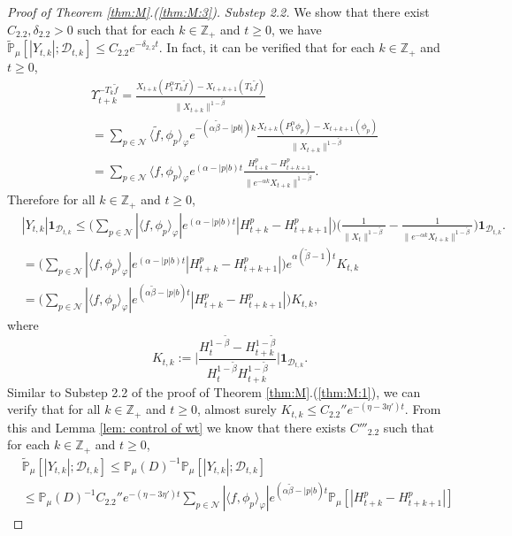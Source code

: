 \documentclass[12pt,a4paper]{amsart}
\theoremstyle{plain}
\theoremstyle{definition}
\numberwithin{equation}{section}
\begin{document}
\begin{proof}[Proof of Theorem \ref{thm:M}.(\ref{thm:M:3})]
  \emph{Substep 2.2.} We show that there exist $C_{2.2}, \delta_{2.2}>0$ such that for each $k \in \mathbb Z_+$ and $t\geq 0$, we have $\widetilde {\mathbb {P}}_\mu[|Y_{t,k}|; \mathcal D_{t,k}]\leq C_{2.2}e^{- \delta_{2,2} t}$.
  In fact, it can be verified that for each $k \in \mathbb Z_+$ and $t\geq 0$,
  \begin{align}
    & \Upsilon_{t+k}^{-T_k\tilde f}
      = \frac{X_{t+k}(P^\alpha_1T_k\tilde f) - X_{t+k+1}(T_k \tilde f)}{\|X_{t+k}\|^{1 - \tilde \beta}}
    \\& = \sum_{p\in \mathcal N}
    \langle\tilde f,\phi_p\rangle_\varphi e^{-(\alpha \tilde \beta - |pb|)k}\frac{ X_{t+k}(P_1^\alpha \phi_p) - X_{t+k+1}(\phi_p)}{\|X_{t+k}\|^{1 - \tilde \beta}}
    \\& = \sum_{p\in \mathcal N}
    \langle f,\phi_p\rangle_\varphi  e^{(\alpha  -|p|b)t}\frac{H_{t+k}^p-H_{t+k+1}^p }{\|e^{-\alpha k}X_{t+k}\|^{1 - \tilde \beta}}.
  \end{align}
  Therefore for all $k\in \mathbb Z_+$ and $t\geq 0$,
  \begin{align}
    &|Y_{t,k}| \mathbf 1_{\mathcal D_{t,k}}
      \leq \Big( \sum_{p\in \mathcal N}|\langle f,\phi_p\rangle_\varphi|  e^{(\alpha  -|p|b)t} | H_{t+k}^p-H_{t+k+1}^p |\Big) \Big( \frac{1}{\|X_t\|^{1 - \tilde \beta}} - \frac{1}{\|e^{-\alpha k}X_{t+k}\|^{1 - \tilde \beta}} \Big)\mathbf 1_{\mathcal D_{t,k}}.
    \\ &= \Big( \sum_{p\in \mathcal N}|\langle f,\phi_p\rangle_\varphi|  e^{(\alpha  -|p|b)t} | H_{t+k}^p-H_{t+k+1}^p |\Big)e^{\alpha (\tilde \beta - 1)t} K_{t,k}
    \\ &= \Big( \sum_{p\in \mathcal N}|\langle f,\phi_p\rangle_\varphi|  e^{(\alpha \tilde \beta  -|p|b)t} | H_{t+k}^p-H_{t+k+1}^p |\Big) K_{t,k},
  \end{align}
  where
  \[
    K_{t,k}
    := \Big| \frac {H_t^{1- \tilde \beta} - H_{t+k}^{1 - \tilde \beta}} {H_t^{1 - \tilde \beta} H_{t+k}^{ 1- \tilde \beta }} \Big| \mathbf{1}_{\mathcal{D}_{t,k}}.
  \]
  Similar to Substep 2.2 of the proof of Theorem \ref{thm:M}.(\ref{thm:M:1}), we can verify that for all $k\in \mathbb Z_+$ and $t\geq 0$, almost surely $K_{t,k} \leq C_{2.2}'' e^{- (\eta - 3\eta')t}$.
  From this and Lemma \ref{lem: control of wt} we know that there exists $C'''_{2.2}$ such that for each $k\in \mathbb Z_+$ and $t\geq 0$,
  \begin{align}
    & \widetilde{\mathbb P}_\mu[|Y_{t,k}|; \mathcal D_{t,k}]
      \leq \mathbb P_\mu(D)^{-1}\mathbb P_\mu[ |Y_{t,k}| ;\mathcal D_{t,k} ]
    \\ & \leq \mathbb P_{\mu}(D)^{-1} C_{2.2}'' e^{- (\eta - 3\eta') t}\sum_{p\in \mathcal {N}} |\langle f,\phi_p\rangle_\varphi|  e^{(\alpha \tilde \beta  -|p|b)t} \mathbb P_\mu[| H_{t+k}^p-H_{t+k+1}^p |]

\end{align}
\end{proof}
\end{document}
